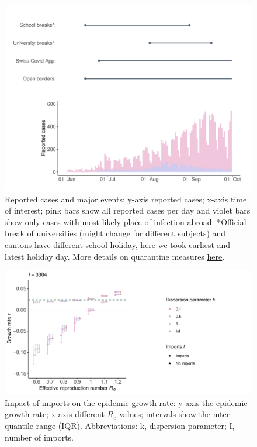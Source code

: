 \documentclass[10pt, a4paper, twoside]{article}
\begin{document}
\begin{figure}[h]
\centering
\includegraphics[scale=0.5]{regulation_cases_reported_2021-03-05.pdf}
\caption{Reported cases and major events: y-axis reported cases; x-axis time of interest; pink bars show all reported cases per day and violet bars show only cases with most likely place of infection abroad. *Official break of universities (might change for different subjects) and cantons have different school holiday, here we took earliest and latest holiday day. More details on quarantine measures  \href{https://www.fedlex.admin.ch/eli/cc/2021/61/de}{here}.}
\end{figure}
\begin{multicols}{2}

\end{multicols}
\begin{figure}[h]
\centering
\includegraphics[scale=0.5]{growth_r_imports_infect_reported_2021-02-24.pdf}
\caption{Impact of imports on the epidemic growth rate: y-axis the epidemic growth rate; x-axis different $R_e$ values; intervals show the inter-quantile range (IQR). Abbreviations: k, dispersion parameter; I, number of imports.}
\end{figure}
\end{document}
